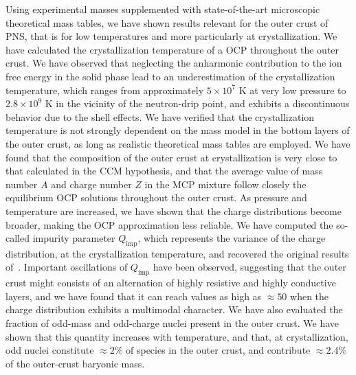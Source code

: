 Using experimental masses supplemented with state-of-the-art microscopic
theoretical mass tables, we have shown results relevant for the outer crust of
PNS, that is for low temperatures and more particularly at crystallization.
We have calculated the crystallization temperature of a OCP throughout the
outer crust. We have observed that neglecting the anharmonic contribution to 
the ion free energy in the solid phase lead to an underestimation of the
crystallization temperature, which ranges from approximately $5\times 10^7$ K 
at very low pressure to $2.8\times 10^9$ K in the vicinity of the neutron-drip 
point, and exhibits a discontinuous behavior due to the shell effects. 
We have verified that the crystallization temperature is not strongly 
dependent on the mass model in the bottom layers of the outer crust, as long as 
realistic theoretical mass tables are employed.
We have found that the composition of the outer crust at crystallization 
is very close to that calculated in the CCM hypothesis, and that the average
value of mass number $A$ and charge number $Z$ in the MCP mixture follow 
closely the equilibrium OCP solutions throughout the outer crust. 
As pressure and temperature are increased, we have shown that the charge 
distributions become broader, making the OCP approximation less reliable.
We have computed the so-called impurity parameter $Q_{\text{imp}}$, which 
represents the variance of the charge distribution, at the crystallization 
temperature, and recovered the original results of~\cite{Fantina2020}.
Important oscillations of $Q_{\text{imp}}$ have been observed, suggesting that
the outer crust might consists of an alternation of highly resistive and 
highly conductive layers, and we have found that it can reach values as high as 
$\approx 50$ when the charge distribution exhibits a multimodal character.
We have also evaluated the fraction of odd-mass and odd-charge nuclei present 
in the outer crust. We have shown that this quantity 
increases with temperature, and that, at crystallization, odd nuclei 
constitute $\approx 2\%$ of species in the outer crust, and contribute 
$\approx 2.4\%$ of the outer-crust baryonic mass. 

